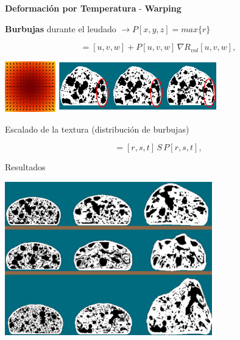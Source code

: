 \documentclass[spanish,unknownkeysallowed,10pt]{beamer}
\begin{document}
\begin{frame}{}
\textbf{Deformación por Temperatura} - \textbf{Warping}




\textbf{Burbujas} durante el leudado $\rightarrow P[x,y,z] = max \bigg\{r\bigg\}$

\begin{equation*}
[r,s,t] = [u,v,w] + P[u,v,w] \, \nabla R_{vol}[u,v,w],
\end{equation*}

\includegraphics[width=2.2cm]{../figures/gradient}
\includegraphics[width=7cm]{../figures/parameterp}

Escalado de la textura (distribución de burbujas)

\begin{equation*}
[x,y,z] = [r,s,t]\, S \, P[r,s,t],
\end{equation*}

\end{frame}

\begin{frame}{Resultados}

\centerline{\includegraphics[width=9cm]{../figures/Fig9}}

\end{frame}
\end{document}
